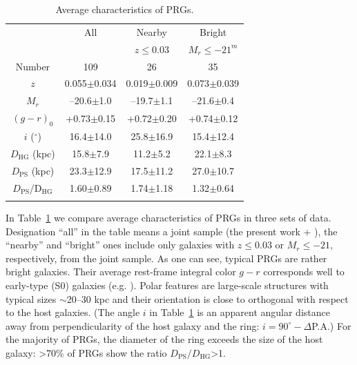 \documentclass[a4paper,fleqn,usenatbib]{mnras}
\begin{document}
\begin{table}
\caption{Average characteristics of PRGs.}
 \label{tab2}
  \begin{tabular}{cccc}
  \hline 
  \hline
       & All      & Nearby         & Bright \\
       &          & $z \leq 0.03$ & $M_r \leq -21^m$ \\
\hline 
Number & 109             & 26               & 35 \\
$z$    & 0.055$\pm$0.034 & 0.019$\pm$0.009  & 0.073$\pm$0.039 \\
$M_r$  & --20.6$\pm$1.0  & --19.7$\pm$1.1   & --21.6$\pm$0.4  \\
$(g - r)_0$ & +0.73$\pm$0.15 & +0.72$\pm$0.20 & +0.74$\pm$0.12 \\
$i$ ($^\circ$) & 16.4$\pm$14.0 & 25.8$\pm$16.9 & 15.4$\pm$12.4 \\
$D_\mathrm{HG}$ (kpc) & 15.8$\pm$7.9   & 11.2$\pm$5.2  & 22.1$\pm$8.3 \\
$D_\mathrm{PS}$ (kpc) & 23.3$\pm$12.9  & 17.5$\pm$11.2 & 27.0$\pm$10.7 \\
$D_\mathrm{PS}$/D$_\mathrm{HG}$ & 1.60$\pm$0.89 & 1.74$\pm$1.18 & 1.32$\pm$0.64 \\
\hline\\
  \end{tabular}
   
\end{table} 
   

In Table~\ref{tab2} we compare average characteristics
of PRGs in three sets of data. Designation ``all'' in the table means
a joint sample (the present work + \citealt{smirmois2013}), the ``nearby'' and
``bright'' ones include only galaxies with $z \leq 0.03$ or $M_r \leq -21$, 
respectively, from the joint sample. As one can see, typical PRGs are rather bright
galaxies. Their average rest-frame integral color $g - r$ corresponds 
well to early-type (S0) galaxies (e.g. \citealt{fukug2007}). Polar
features are large-scale structures with typical sizes $\sim$20--30 kpc
and their orientation is close to orthogonal with respect to the host galaxies.
(The angle $i$ in Table~\ref{tab2} is an apparent angular distance away from 
perpendicularity of the host galaxy and the ring: $i = 90^\circ - \Delta$P.A.)
For the majority of PRGs, the diameter of the ring exceeds the
size of the host galaxy: >70\% of PRGs show the ratio $D_\mathrm{PS}/D_\mathrm{HG}$>1.
\end{document}
